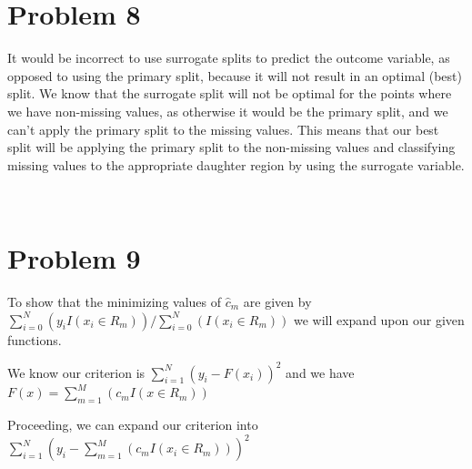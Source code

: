 \documentclass[11pt]{article}
\begin{document}
\section*{Problem 8}

\vspace{5 mm}
\noindent
It would be incorrect to use surrogate splits to predict the outcome variable, 
as opposed to using the primary split, because it will not result in an optimal 
(best) split.  We know that the surrogate split will not be optimal for the 
points where we have non-missing values, as otherwise it would be the primary 
split, and we can't apply the primary split to the missing values.  This means 
that our best split will be applying the primary split to the non-missing 
values and classifying missing values to the appropriate daughter region by 
using the surrogate variable.

\newpage
\begin{center}
\ \\
\end{center}

\section*{Problem 9}

\vspace{5 mm}
\noindent
To show that the minimizing values of $\hat{c}_{m}$ are given by 
$\sum\limits_{i=0}^N (y_{i} I(x_{i} \in R_{m})) / 
\sum\limits_{i=0}^N (I(x_{i} \in R_{m}))$ 
we will expand upon our given functions.

\vspace{3 mm}
\noindent
We know our criterion is $\sum\limits_{i=1}^N (y_{i} - F(x_{i}))^2$ and we have 
$F(x) = \sum\limits_{m=1}^M (c_{m}I(x \in R_{m}))$

\vspace{3 mm}
\noindent
Proceeding, we can expand our criterion into 
$\sum\limits_{i=1}^N (y_{i} - \sum\limits_{m=1}^M (c_{m}I(x_{i} \in R_{m})))^2$
\end{document}
